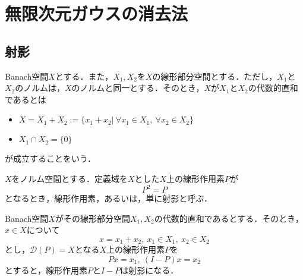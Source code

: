 %


\chapter{無限次元ガウスの消去法\cite{}}
\section{射影}

\begin{dfn}[代数的直和]
  Banach空間$X$とする．また，$X_1,X_2$を$X$の線形部分空間とする．ただし，$X_1$と$X_2$のノルムは，$X$のノルムと同一とする．そのとき，$X$が$X_1$と$X_2$の代数的直和であるとは
  \begin{itemize}
    \item $X=X_1+X_2:=\{x_1+x_2 | \  \forall x_1 \in X_1, \ \forall x_2 \in X_2 \}$
    \item $X_1 \cap X_2 = \{0\}$
  \end{itemize}
  が成立することをいう．
\end{dfn}

\begin{dfn}[射影]
  $X$をノルム空間とする．定義域を$X$とした$X$上の線形作用素$P$が
  \begin{equation*}
    P^2=P
  \end{equation*}
  となるとき，線形作用素，あるいは，単に射影と呼ぶ．
\end{dfn}

\begin{thm}
  Banach空間$X$がその線形部分空間$X_1,X_2$の代数的直和であるとする．そのとき，$x\in X$について
  \begin{equation*}
    x=x_1+x_2,\ x_1 \in X_1,\ x_2 \in X_2
  \end{equation*}
とし，$\mathcal{D}(P)=X$となる$X$上の線形作用素$P$を
\begin{equation*}
  Px=x_1,\ (I-P)x=x_2
\end{equation*}
とすると，線形作用素$P$と$I-P$は射影になる．
\end{thm}

